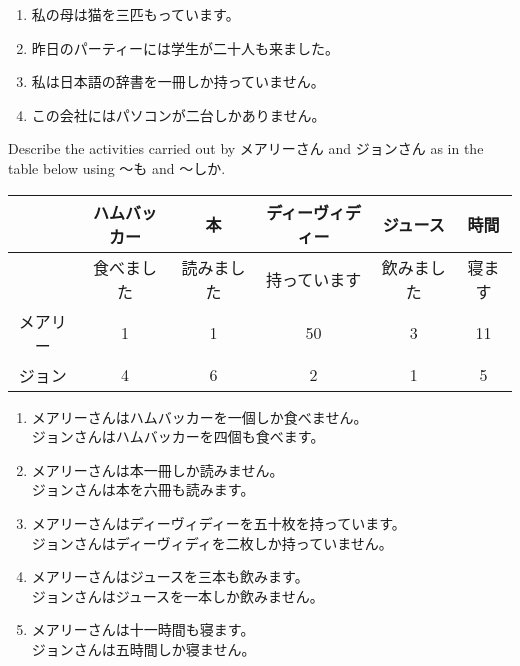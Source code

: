 \documentclass[notoc,notitlepage]{tufte-book}
\begin{document}
\begin{eg}
  \begin{enumerate}
    \item 私の母は猫を三匹もっています。
    \item 昨日のパーティーには学生が二十人も来ました。
    \item 私は日本語の辞書を一冊しか持っていません。
    \item この会社にはパソコンが二台しかありません。
  \end{enumerate}
\end{eg}

\begin{ex}
  Describe the activities carried out by メアリーさん and ジョンさん as in the table below using 〜も and 〜しか.
  \begin{center}
  \begin{tabular}{c | c | c | c | c | c}
             & ハムバッカー & 本         & ディーヴィディー & ジュース   & 時間 \\
             \hline
             & 食べました   & 読みました & 持っています     & 飲みました & 寝ます \\
             \hline
    メアリー & 1            & 1          & 50               & 3          & 11 \\
    ジョン   & 4            & 6          & 2                & 1          & 5
  \end{tabular}
  \end{center}
  \begin{enumerate}
    \item メアリーさんはハムバッカーを一個しか食べません。\\
      ジョンさんはハムバッカーを四個も食べます。

    \item メアリーさんは本一冊しか読みません。\\
      ジョンさんは本を六冊も読みます。

    \item メアリーさんはディーヴィディーを五十枚を持っています。\\
      ジョンさんはディーヴィディを二枚しか持っていません。

    \item メアリーさんはジュースを三本も飲みます。\\
      ジョンさんはジュースを一本しか飲みません。

    \item メアリーさんは十一時間も寝ます。\\
      ジョンさんは五時間しか寝ません。
  \end{enumerate}
\end{ex}
\end{document}
